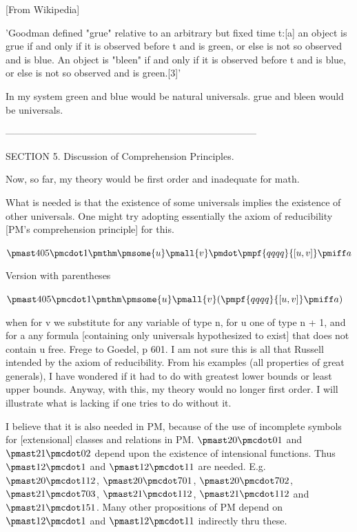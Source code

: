 \documentclass[12pt]{article}
\begin{document}
[From Wikipedia]

'Goodman defined "grue" relative to an arbitrary but fixed time t:[a] an object is grue if and only if it is observed before t and is green, or else is not so observed and is blue. An object is "bleen" if and only if it is observed before t and is blue, or else is not so observed and is green.[3]'

In my system green and blue would be natural universals. grue and bleen would be universals.

------------------------------------------------------------------------------

SECTION 5. Discussion of Comprehension Principles.

Now, so far, my theory would be first order and inadequate for math.

What is needed is that the existence of some universals implies the existence of other universals. One might try adopting essentially the axiom of reducibility [PM's comprehension principle] for this.

$\pmast 405 \pmcdot 1 \pmthm \pmsome{u} \pmall{v} \pmdot \pmpf{qqqq}{[u,v]} \pmiff a$
 
 

Version with parentheses

$\pmast 405 \pmcdot 1 \pmthm \pmsome{u} \pmall{v}  (  \pmpf{qqqq}{[u,v]} \pmiff a)$


when for v we substitute for any variable of type n, for u one of type n + 1, and for a any formula [containing only universals hypothesized to exist] that does not contain u free. Frege to Goedel, p 601. I am not sure this is all that Russell intended by the axiom of reducibility. From his examples (all properties of great generals), I have wondered if it had to do with  greatest lower bounds or least upper bounds. Anyway, with this, my theory would no longer first order. I will illustrate what is lacking if one tries to do without it.

I believe that it is also needed in PM, because of the use of incomplete symbols for [extensional] classes and relations in PM. $\pmast 20 \pmcdot 01$ and $\pmast 21 \pmcdot 02$ depend upon the existence of intensional functions. Thus $\pmast 12 \pmcdot 1$ and $\pmast 12 \pmcdot 11$ are needed. E.g. $\pmast 20 \pmcdot 112$,
$\pmast 20 \pmcdot 701$, $\pmast 20 \pmcdot 702$, $\pmast 21 \pmcdot 703$,
$\pmast 21 \pmcdot 112$, $\pmast 21 \pmcdot 112$ and $\pmast 21 \pmcdot 151$.
Many other propositions of PM depend on $\pmast 12 \pmcdot 1$ and
$\pmast 12 \pmcdot 11$ indirectly thru these.
\end{document}
